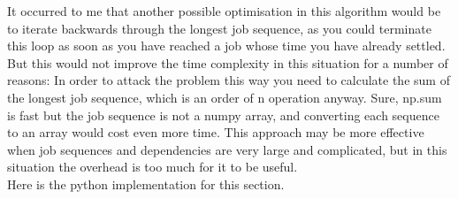 \documentclass[paper=a4, fontsize=12pt]{scrartcl} %
\numberwithin{equation}{section}       %
\numberwithin{figure}{section}         %
\numberwithin{table}{section}          %
\begin{document}
\bcattention \quad It occurred to me that another possible optimisation in this algorithm would be to iterate backwards through the longest job sequence, as you could terminate this loop as soon as you have reached a job whose time you have already settled. But this would not improve the time complexity in this situation for a number of reasons: In order to attack the problem this way you need to calculate the sum of the longest job sequence, which is an order of n operation anyway. Sure, np.sum is fast but the job sequence is not a numpy array, and converting each sequence to an array would cost even more time. This approach may be more effective when job sequences and dependencies are very large and complicated, but in this situation the overhead is too much for it to be useful. \\

Here is the python implementation for this section.
\end{document}
